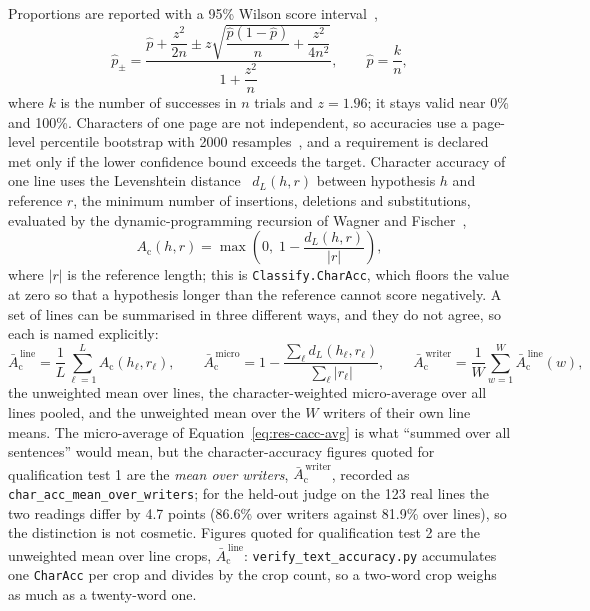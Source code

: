 Proportions are reported with a 95\% Wilson score interval~\cite{wilson1927},
\begin{equation}
\label{eq:res-wilson}
\hat p_{\pm}=\frac{\hat p+\dfrac{z^2}{2n}\pm z\sqrt{\dfrac{\hat p(1-\hat p)}{n}+\dfrac{z^2}{4n^2}}}{1+\dfrac{z^2}{n}},\qquad \hat p=\frac{k}{n},
\end{equation}
where $k$ is the number of successes in $n$ trials and $z=1.96$; it stays valid near 0\% and 100\%.
Characters of one page are not independent, so accuracies use a page-level percentile bootstrap with 2000 resamples~\cite{efron1979}, and a requirement is declared met only if the lower confidence bound exceeds the target.
Character accuracy of one line uses the Levenshtein distance~\cite{levenshtein1966} $d_L(h,r)$ between hypothesis $h$ and reference $r$, the minimum number of insertions, deletions and substitutions, evaluated by the dynamic-programming recursion of Wagner and Fischer~\cite{wagner1974},
\begin{equation}
\label{eq:res-cacc}
A_{\mathrm{c}}(h,r)=\max\left(0,\;1-\frac{d_L(h,r)}{\lvert r\rvert}\right),
\end{equation}
where $\lvert r\rvert$ is the reference length; this is \texttt{Classify.CharAcc}, which floors the value at zero so that a hypothesis longer than the reference cannot score negatively.
A set of lines can be summarised in three different ways, and they do not agree, so each is named explicitly:
\begin{equation}
\label{eq:res-cacc-avg}
\bar A_{\mathrm{c}}^{\,\mathrm{line}}=\frac{1}{L}\sum_{\ell=1}^{L}A_{\mathrm{c}}(h_\ell,r_\ell),\qquad
\bar A_{\mathrm{c}}^{\,\mathrm{micro}}=1-\frac{\sum_\ell d_L(h_\ell,r_\ell)}{\sum_\ell\lvert r_\ell\rvert},\qquad
\bar A_{\mathrm{c}}^{\,\mathrm{writer}}=\frac{1}{W}\sum_{w=1}^{W}\bar A_{\mathrm{c}}^{\,\mathrm{line}}(w),
\end{equation}
the unweighted mean over lines, the character-weighted micro-average over all lines pooled, and the unweighted mean over the $W$ writers of their own line means.
The micro-average of Equation~\ref{eq:res-cacc-avg} is what ``summed over all sentences'' would mean, but the character-accuracy figures quoted for qualification test 1 are the \emph{mean over writers}, $\bar A_{\mathrm{c}}^{\,\mathrm{writer}}$, recorded as \texttt{char\_acc\_mean\_over\_writers}; for the held-out judge on the 123 real lines the two readings differ by 4.7 points (86.6\% over writers against 81.9\% over lines), so the distinction is not cosmetic.
Figures quoted for qualification test 2 are the unweighted mean over line crops, $\bar A_{\mathrm{c}}^{\,\mathrm{line}}$: \texttt{verify\_text\_accuracy.py} accumulates one \texttt{CharAcc} per crop and divides by the crop count, so a two-word crop weighs as much as a twenty-word one.
